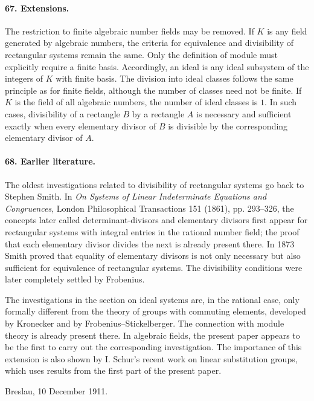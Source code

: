 \documentclass[11pt]{article}
\begin{document}
\paragraph{67. Extensions.}
The restriction to finite algebraic number fields may be removed. If $K$ is any field generated by algebraic numbers, the criteria for equivalence and divisibility of rectangular systems remain the same. Only the definition of module must explicitly require a finite basis. Accordingly, an ideal is any ideal subsystem of the integers of $K$ with finite basis. The division into ideal classes follows the same principle as for finite fields, although the number of classes need not be finite. If $K$ is the field of all algebraic numbers, the number of ideal classes is $1$. In such cases, divisibility of a rectangle $B$ by a rectangle $A$ is necessary and sufficient exactly when every elementary divisor of $B$ is divisible by the corresponding elementary divisor of $A$.

\paragraph{68. Earlier literature.}
The oldest investigations related to divisibility of rectangular systems go back to Stephen Smith. In \emph{On Systems of Linear Indeterminate Equations and Congruences}, London Philosophical Transactions 151 (1861), pp. 293--326, the concepts later called determinant-divisors and elementary divisors first appear for rectangular systems with integral entries in the rational number field; the proof that each elementary divisor divides the next is already present there. In 1873 Smith proved that equality of elementary divisors is not only necessary but also sufficient for equivalence of rectangular systems. The divisibility conditions were later completely settled by Frobenius.

The investigations in the section on ideal systems are, in the rational case, only formally different from the theory of groups with commuting elements, developed by Kronecker and by Frobenius--Stickelberger. The connection with module theory is already present there. In algebraic fields, the present paper appears to be the first to carry out the corresponding investigation. The importance of this extension is also shown by I. Schur's recent work on linear substitution groups, which uses results from the first part of the present paper.

Breslau, 10 December 1911.
\end{document}
